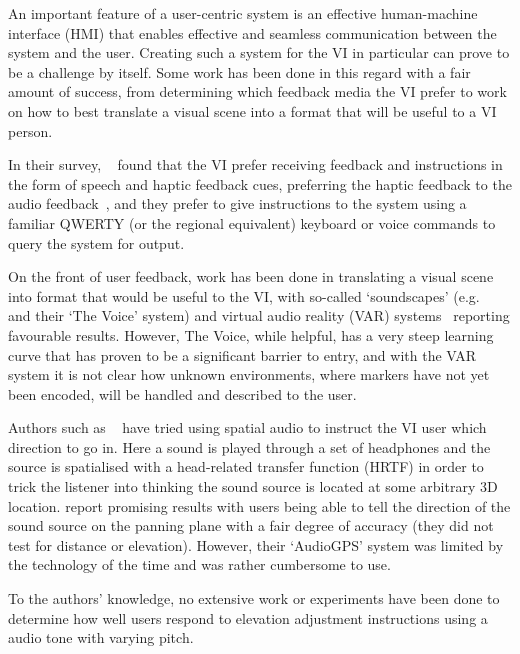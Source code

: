 \documentclass[format=sigconf, review=true, screen=true, anonymous=true]{acmart}
\begin{document}
An important feature of a user-centric system is an effective human-machine interface (HMI) that enables effective and seamless communication between the system and the user. Creating such a system for the VI in particular can prove to be a challenge by itself. Some work has been done in this regard with a fair amount of success, from determining which feedback media the VI prefer to work on how to best translate a visual scene into a format that will be useful to a VI person. 

In their survey, \citeauthor{khoo2016multimodal}~\cite{khoo2016multimodal} found that the VI prefer receiving feedback and instructions in the form of speech and haptic feedback cues, preferring the haptic feedback to the audio feedback~\cite{ross2000wearable}, and they prefer to give instructions to the system using a familiar QWERTY (or the regional equivalent) keyboard or voice commands to query the system for output. 

On the front of user feedback, work has been done in translating a visual scene into format that would be useful to the VI, with so-called `soundscapes' (e.g. \citeauthor{meijer2010}~\cite{meijer2010} and their `The Voice' system) and virtual audio reality (VAR) systems~\cite{frauenberger2003} reporting favourable results. However, The Voice, while helpful, has a very steep learning curve that has proven to be a significant barrier to entry, and with the VAR system it is not clear how unknown environments, where markers have not yet been encoded, will be handled and described to the user. 

Authors such as \citeauthor{holland2002audiogps}~\cite{holland2002audiogps} have tried using spatial audio to instruct the VI user which direction to go in. Here a sound is played through a set of headphones and the source is spatialised with a head-related transfer function (HRTF) in order to trick the listener into thinking the sound source is located at some arbitrary 3D location. \citeauthor{holland2002audiogps} report promising results with users being able to tell the direction of the sound source on the panning plane with a fair degree of accuracy (they did not test for distance or elevation). However, their `AudioGPS' system was limited by the technology of the time and was rather cumbersome to use. 

To the authors' knowledge, no extensive work or experiments have been done to determine how well users respond to elevation adjustment instructions using a audio tone with varying pitch. 
\end{document}

